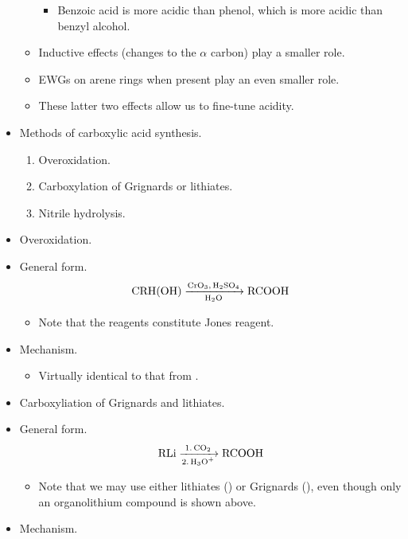 \documentclass[../notes.tex]{subfiles}
\begin{document}
\begin{itemize}
\begin{itemize}
\begin{itemize}
            \item Benzoic acid is more acidic than phenol, which is more acidic than benzyl alcohol.
        \end{itemize}
        \item Inductive effects (changes to the $\alpha$ carbon) play a smaller role.
        \item EWGs on arene rings when present play an even smaller role.
        \item These latter two effects allow us to fine-tune acidity.
    \end{itemize}
    \item Methods of carboxylic acid synthesis.
    \begin{enumerate}
        \item Overoxidation.
        \item Carboxylation of Grignards or lithiates.
        \item Nitrile hydrolysis.
    \end{enumerate}
    \item Overoxidation.
    \item General form.
    \begin{equation*}
        \ce{CRH(OH) ->[CrO3, H2SO4][H2O] RCOOH}
    \end{equation*}
    \begin{itemize}
        \item Note that the reagents constitute Jones reagent.
    \end{itemize}
    \item Mechanism.
    \begin{itemize}
        \item Virtually identical to that from \textcite{bib:CHEM22100Notes}.
    \end{itemize}
    \item Carboxyliation of Grignards and lithiates.
    \item General form.
    \begin{equation*}
        \ce{RLi ->[1. CO2][2. H3O+] RCOOH}
    \end{equation*}
    \begin{itemize}
        \item Note that we may use either lithiates () or Grignards (), even though only an organolithium compound is shown above.
    \end{itemize}
    \item Mechanism.
    \begin{figure}[h!]

\end{figure}
\end{itemize}
\end{document}

